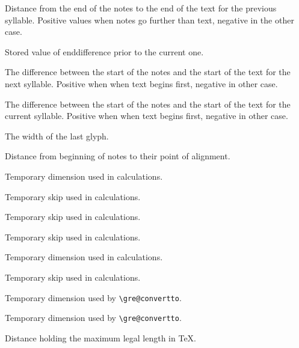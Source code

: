 Distance from the end of the notes to the end of the text for the previous syllable.  Positive values when notes go further than text, negative in the other case.

Stored value of enddifference prior to the current one.

The difference between the start of the notes and the start of the text for the next syllable.  Positive when when text begins first, negative in other case.

The difference between the start of the notes and the start of the text for the current syllable.  Positive when when text begins first, negative in other case.

The width of the last glyph.

Distance from beginning of notes to their point of alignment.

Temporary dimension used in calculations.

Temporary skip used in calculations.

Temporary skip used in calculations.

Temporary skip used in calculations.

Temporary dimension used in calculations.

Temporary skip used in calculations.

Temporary dimension used by \verb=\gre@convertto=.

Temporary dimension used by \verb=\gre@convertto=.

Distance holding the maximum legal length in TeX.



